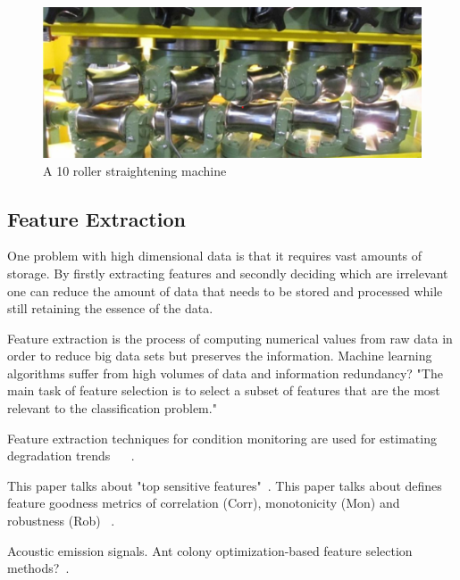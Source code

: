 \documentclass{article}
\begin{document}
\begin{figure}[H]
	\centering
	\includegraphics[width=\textwidth, keepaspectratio]{Straightening6.png}
	\caption{A 10 roller straightening machine~\cite{zhang2019modeling}}
	\label{straighteningImage6}
\end{figure}


\subsection{Feature Extraction}

One problem with high dimensional data is that it requires vast amounts of storage. By firstly extracting features and secondly deciding which are irrelevant one can reduce the amount of data that needs to be stored and processed while still retaining the essence of the data.

Feature extraction is the process of computing numerical values from raw data in order to reduce big data sets but preserves the information. Machine learning algorithms suffer from high volumes of data and information redundancy?
"The main task of feature selection is to select a subset of features that are the most relevant to the classification problem." ~\cite{ahmed2020condition}

Feature extraction techniques for condition monitoring are used for estimating degradation trends ~\cite{caesarendra2017review} ~\cite{adams2017comparison}.

This paper talks about "top sensitive features"~\cite{bleakie2013feature}.
This paper talks about defines feature goodness metrics of correlation (Corr), monotonicity (Mon) and robustness (Rob) ~\cite{zhang2016degradation}.

Acoustic emission signals. Ant colony optimization-based feature selection methods?~\cite{liao2010feature}.
\end{document}
